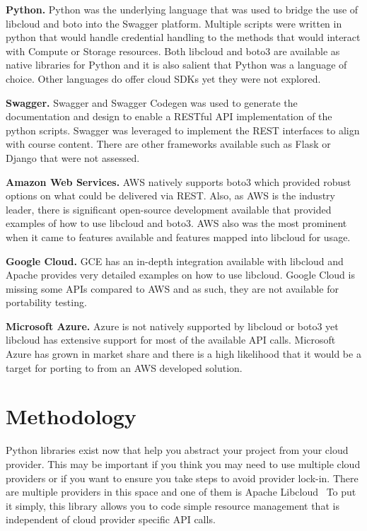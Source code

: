 \begin{description}

\item{\bf Python.} Python was the underlying language that was used to bridge
the use of libcloud and boto into the Swagger platform. Multiple scripts were
written in python that would handle credential handling to the methods that
would interact with Compute or Storage resources. Both libcloud and boto3 are
available as native libraries for Python and it is also salient that Python was
a language of choice. Other languages do offer cloud SDKs yet they were not
explored.
\item{\bf Swagger.} Swagger and Swagger Codegen was used to generate the
documentation and design to enable a RESTful API implementation of the python
scripts. Swagger was leveraged to implement the REST interfaces to
align with course content. There are other frameworks available such as Flask
or
Django that were not assessed.
\item{\bf Amazon Web Services.} AWS natively supports boto3 which provided
robust options on what could be delivered via REST. Also, as AWS is the
industry
leader, there is significant open-source development available that provided
examples of how to use libcloud and boto3. AWS also was the most prominent when
it came to features available and features mapped into libcloud for usage.
\item{\bf Google Cloud.} GCE has an in-depth integration available with
libcloud and Apache provides very detailed examples on how to use libcloud.
Google Cloud is missing some APIs compared to AWS and as such, they are not
available for portability testing.
\item{\bf Microsoft Azure.} Azure is not natively supported by libcloud or
boto3
yet libcloud has extensive support for most of the available API calls.
Microsoft Azure has grown in market share and there is a high likelihood that
it
would be a target for porting to from an AWS developed solution.

\end{description}

\section{Methodology}

Python libraries exist now that help you abstract your project from  your cloud
provider. This may be important if you think you may need to use multiple cloud
providers or if you want to ensure you take steps to avoid provider lock-in.
There are multiple providers in this space and one of them is Apache
Libcloud~\cite{hid-sp18-518-LibCloud} To put it simply, this library allows you
to code simple resource  management that is independent of cloud provider
specific API calls.

